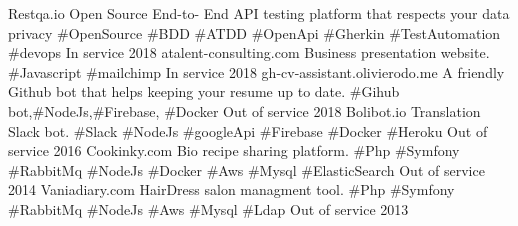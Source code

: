 
\begin{cvhonors}

  \cvhonor
    {Restqa.io} %
    {Open Source End-to- End API testing platform that respects your data privacy \#OpenSource \#BDD  \#ATDD \#OpenApi \#Gherkin \#TestAutomation \#devops}
    {In service} %
    {2018} %
  \cvhonor
    {atalent-consulting.com} %
    {Business presentation website. \#Javascript \#mailchimp}
    {In service} %
    {2018} %
  \cvhonor
    {gh-cv-assistant.olivierodo.me} %
    {A friendly Github bot that helps keeping your resume up to date. \#Gihub bot,\#NodeJs,\#Firebase, \#Docker}
    {Out of service} %
    {2018} %
  \cvhonor
    {Bolibot.io} %
    {Translation Slack bot.  \#Slack \#NodeJs \#googleApi \#Firebase \#Docker \#Heroku}
    {Out of service} %
    {2016} %
  \cvhonor
    {Cookinky.com} %
    {Bio recipe sharing platform. \#Php \#Symfony \#RabbitMq \#NodeJs  \#Docker \#Aws \#Mysql \#ElasticSearch}
    {Out of service} %
    {2014} %
  \cvhonor
    {Vaniadiary.com} %
    {HairDress salon managment tool. \#Php \#Symfony \#RabbitMq \#NodeJs \#Aws \#Mysql \#Ldap}
    {Out of service} %
    {2013} %

\end{cvhonors}
